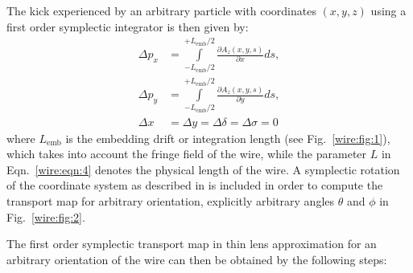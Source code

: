 \documentclass[english]{article}
\begin{document}
The kick experienced by an arbitrary particle with coordinates $(x,y,z)$ using a first order symplectic integrator is then given by:
\begin{align}\label{wire:eqn:5}
\Delta p_x &= \int\limits_{-L_{\mathrm{emb}}/2}^{+L_{\mathrm{emb}}/2}{\frac{\partial A_z(x,y,s)}{\partial x}ds}, \\
 \Delta p_y & = \int\limits_{-L_{\mathrm{emb}}/2}^{+L_{\mathrm{emb}}/2}{\frac{\partial A_z(x,y,s)}{\partial y}ds},\\
 \Delta x &=\Delta y=\Delta \delta = \Delta \sigma = 0 
\end{align}
where $L_{\mathrm{emb}}$ is the embedding drift or integration length (see Fig.~\ref{wire:fig:1}), which takes into account the fringe field of the wire, while the parameter $L$ in Eqn.~\ref{wire:eqn:4} denotes the physical length of the wire. A symplectic rotation of the coordinate system as described in \cite{forest99} is included in order to compute the transport map for arbitrary orientation, explicitly arbitrary angles $\theta$ and $\phi$ in Fig.~\ref{wire:fig:2}.  

The first order symplectic transport map in thin lens approximation for an arbitrary orientation of the wire can then be obtained by the following steps:
\end{document}
